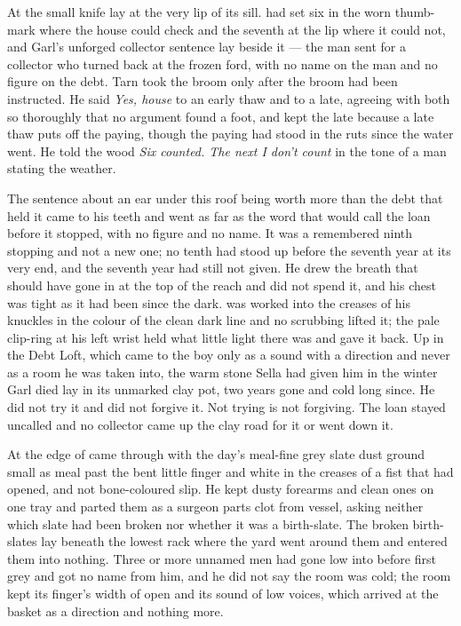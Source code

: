 At  the small knife lay at the very lip of its sill.  had set six in the worn thumb-mark where the house could check and the seventh at the lip where it could not, and Garl's unforged collector sentence lay beside it --- the man sent for a collector who turned back at the frozen ford, with no name on the man and no figure on the debt. Tarn took the broom only after the broom had been instructed. He said \emph{Yes, house} to an early thaw and to a late, agreeing with both so thoroughly that no argument found a foot, and kept the late because a late thaw puts off the paying, though the paying had stood in the ruts since the water went. He told the wood \emph{Six counted. The next I don't count} in the tone of a man stating the weather.

The sentence about an ear under this roof being worth more than the debt that held it came to his teeth and went as far as the word that would call the loan before it stopped, with no figure and no name. It was a remembered ninth stopping and not a new one; no tenth had stood up before the seventh year at its very end, and the seventh year had still not given. He drew the breath that should have gone in at the top of the reach and did not spend it, and his chest was tight as it had been since the dark.  was worked into the creases of his knuckles in the colour of the clean dark line and no scrubbing lifted it; the pale clip-ring at his left wrist held what little light there was and gave it back. Up in the Debt Loft, which came to the boy only as a sound with a direction and never as a room he was taken into, the warm stone Sella had given him in the winter Garl died lay in its unmarked clay pot, two years gone and cold long since. He did not try it and did not forgive it. Not trying is not forgiving. The loan stayed uncalled and no collector came up the clay road for it or went down it.

At the edge of   came through with the day's meal-fine grey slate dust ground small as meal past the bent little finger and white in the creases of a fist that had opened, and not bone-coloured slip. He kept dusty forearms and clean ones on one tray and parted them as a surgeon parts clot from vessel, asking neither which slate had been broken nor whether it was a birth-slate. The broken birth-slates lay beneath the lowest rack where the yard went around them and entered them into nothing. Three or more unnamed men had gone low into  before first grey and got no name from him, and he did not say the room was cold; the room kept its finger's width of open and its sound of low voices, which arrived at the basket as a direction and nothing more.

